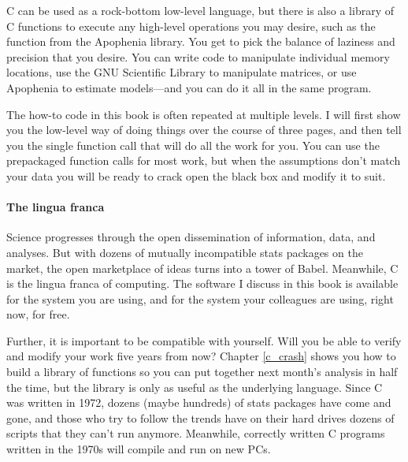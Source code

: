 C can be used as a rock-bottom low-level language, but there is also a
library of C functions to execute any high-level operations you may
desire, such as the  function from
the Apophenia library.  
You get to pick the balance of laziness and precision that you desire. You
can write code to manipulate individual memory locations, use the GNU Scientific
Library to manipulate matrices, or use Apophenia to estimate models---and
you can do it all in the same program.

The how-to code in this book is often repeated at multiple levels. I
will first show you the low-level way of doing things over the course
of three pages, and then tell you the single function call that will do
all the work for you. You can use the prepackaged function calls for
most work, but when the assumptions don't match your data you will be
ready to crack open the black box and modify it to suit.

\paragraph{The lingua franca}
Science progresses through the open dissemination of information, data,
and analyses. But with dozens of mutually incompatible stats packages
on the market, the open marketplace of ideas turns into a tower of Babel.
Meanwhile, C is the lingua franca of computing. The software I discuss
in this book is available for the system you are using, and for the
system your colleagues are using, right now, for free.

Further, it is important to be compatible with yourself. Will you be
able to verify and modify your work five years from now?  Chapter
\ref{c_crash} shows you how to build a library of functions so you can
put together next month's analysis in half the time, but the library is
only as useful as the underlying language.  Since C was written in 1972,
dozens (maybe hundreds) of stats packages have come and gone, and those
who try to follow the trends have on their hard drives dozens of scripts
that they can't run anymore.  Meanwhile, correctly written C programs
written in the 1970s will compile and run on new PCs.  




